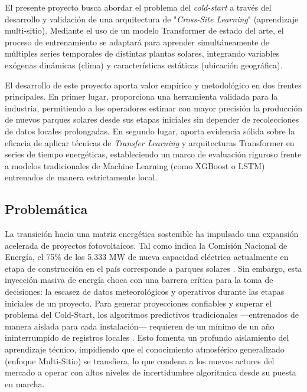 El presente proyecto busca abordar el problema del \textit{cold-start} a través del desarrollo y validación de una arquitectura de "\textit{Cross-Site Learning}" (aprendizaje multi-sitio). Mediante el uso de un modelo Transformer de estado del arte, el proceso de entrenamiento se adaptará para aprender simultáneamente de múltiples series temporales de distintas plantas solares, integrando variables exógenas dinámicas (clima) y características estáticas (ubicación geográfica).

El desarrollo de este proyecto aporta valor empírico y metodológico en dos frentes principales. En primer lugar, proporciona una herramienta validada para la industria, permitiendo a los operadores estimar con mayor precisión la producción de nuevos parques solares desde sus etapas iniciales sin depender de recolecciones de datos locales prolongadas. En segundo lugar, aporta evidencia sólida sobre la eficacia de aplicar técnicas de \textit{Transfer Learning} y arquitecturas Transformer en series de tiempo energéticas, estableciendo un marco de evaluación riguroso frente a modelos tradicionales de Machine Learning (como XGBoost o LSTM) entrenados de manera estrictamente local.

\subsection{Problemática}
La transición hacia una matriz energética sostenible ha impulsado una expansión acelerada de proyectos fotovoltaicos. Tal como indica la Comisión Nacional de Energía, el 75\% de los 5.333 MW de nueva capacidad eléctrica actualmente en etapa de construcción en el país corresponde a parques solares \cite{cne2026}. Sin embargo, esta inyección masiva de energía choca con una barrera crítica para la toma de decisiones: la escasez de datos meteorológicos y operativos durante las etapas iniciales de un proyecto. Para generar proyecciones confiables y superar el problema del Cold-Start, los algoritmos predictivos tradicionales —entrenados de manera aislada para cada instalación— requieren de un mínimo de un año ininterrumpido de registros locales \cite{rodriguez2023energy}. Esto fomenta un profundo aislamiento del aprendizaje técnico, impidiendo que el conocimiento atmosférico generalizado (enfoque Multi-Sitio) se transfiera, lo que condena a los nuevos actores del mercado a operar con altos niveles de incertidumbre algorítmica desde su puesta en marcha.

